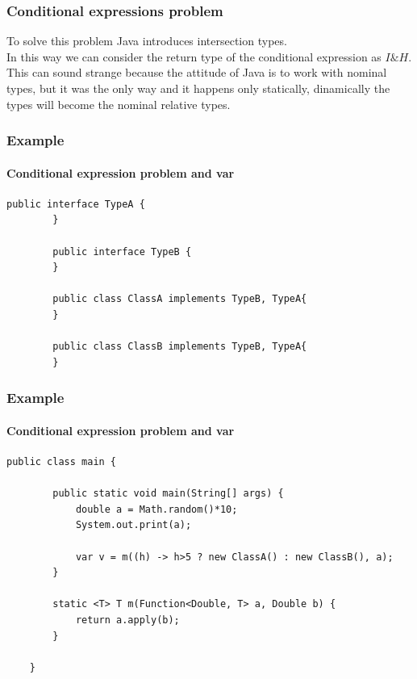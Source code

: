 \documentclass{beamer}
\begin{document}
\begin{frame}
\frametitle{Conditional expressions problem}
\boldmath
To solve this problem Java introduces intersection types.\\
In this way we can consider the return type of the conditional expression as $I\&H$.\\
This can sound strange because the attitude of Java is to work with nominal types, but it was the only way and it happens only statically, dinamically the types will become the nominal relative types.
\end{frame}

\begin{frame}[fragile]
\frametitle{Example}
\framesubtitle{Conditional expression problem and var}
\begin{flushleft}
	\begin{lstlisting}[basicstyle=\scriptsize]
		public interface TypeA {
		}
		
		public interface TypeB {
		}
		
		public class ClassA implements TypeB, TypeA{
		}

		public class ClassB implements TypeB, TypeA{
		}
	\end{lstlisting}
\end{flushleft}
\end{frame}

\begin{frame}[fragile]
\frametitle{Example}
\framesubtitle{Conditional expression problem and var}
\begin{flushleft}
	\begin{lstlisting}[basicstyle=\scriptsize]
	public class main {
	
		public static void main(String[] args) {
			double a = Math.random()*10;
			System.out.print(a);
	
			var v = m((h) -> h>5 ? new ClassA() : new ClassB(), a);
		}
	
		static <T> T m(Function<Double, T> a, Double b) {
			return a.apply(b);
		}
	
	}
	\end{lstlisting}
\end{flushleft}
\end{frame}
\end{document}

